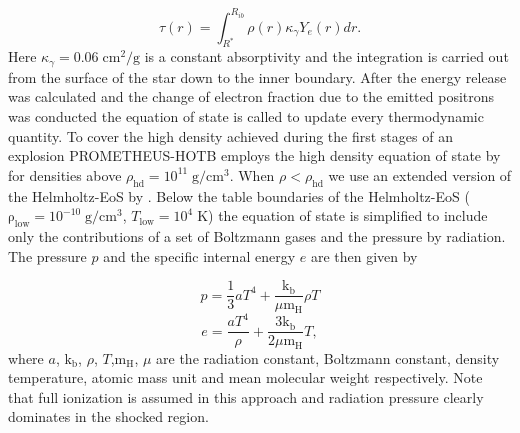 \documentclass[fleqn,usenatbib]{mnras}
\newcommand{\prom}{\textsc{P{\footnotesize ROMETHEUS}-H{\footnotesize OT}B}\xspace}
\begin{document}
\begin{equation}
	\tau(r) = \int_{R^*}^{R_{ib}}\rho(r) \kappa_{\gamma} Y_e(r) dr.
\end{equation}Here $\kappa_{\gamma}=0.06 \;\mathrm{cm^2/g}$ is a constant absorptivity and the integration is carried out from the surface of the star down to the inner boundary. 
After the energy release was calculated and the change of electron fraction due to the emitted positrons was conducted the equation of state is called to update every thermodynamic quantity.
To cover the high density achieved during the first stages of an explosion \prom  employs the high density equation of state by \citet{Lattimer1991} for densities above $\rho_{\mathrm{hd}}=10^{11}\;\mathrm{g/cm^3}$. When $\rho<\rho_{\mathrm{hd}}$ we use an extended version of the Helmholtz-EoS by \citet{Timmes1999}. Below the table boundaries of the Helmholtz-EoS ($\mathrm{\rho_{low}}=10^{-10}\mathrm{\;g/cm^3}$, $T_{\mathrm{low}}=10^{4}\mathrm{\;K}$) the equation of state is simplified to include only the contributions of a set of Boltzmann gases and the pressure by radiation. The pressure $p$ and the specific internal energy $e$ are then given by

\begin{equation}
    \label{equ:pressure-boltzmann-radiation}
    p = \frac{1}{3}aT^4 + \frac{\mathrm{k_b}}{\mu \mathrm{m_{H}}} \rho T
\end{equation}
\begin{equation}
    \label{equ:energy-boltzmann-radiation}
    e = \frac{aT^4}{\rho} + \frac{3\mathrm{k_b}}{2\mu \mathrm{m_{H}}} T,
\end{equation}
where $a$, $\mathrm{k_b}$, $\rho$, $T$,$\mathrm{m_{H}}$, $\mu$ are the radiation constant, Boltzmann constant, density temperature, atomic mass unit and mean molecular weight respectively. Note that full ionization is assumed in this approach and radiation pressure clearly dominates in the shocked region.
\end{document}
